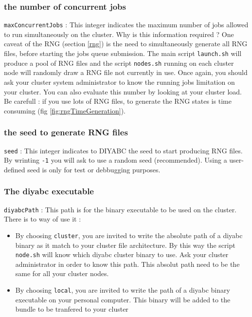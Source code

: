 \subsubsection{the number of concurrent jobs}
\texttt{maxConcurrentJobs} : This integer indicates the maximum number of jobs allowed to run simultaneously on the cluster. Why is this information required ? One caveat of the RNG (section \ref{rng}) is the need to simultaneously generate all RNG files, before starting the jobs queue submission. The main script \texttt{launch.sh} will produce a pool of RNG files and the script \texttt{nodes.sh} running on each cluster node will randomly draw a RNG file not currently in use. Once again, you should ask your cluster system administrator to know the running jobs limitation on your cluster. You can also evaluate this number by looking at your cluster load. Be carefull : if you use lots of RNG files, to generate the RNG states is time consuming (fig \ref{fig:rngTimeGeneration}).

\subsubsection{the seed to generate RNG files}
\texttt{seed} : This integer indicates to DIYABC the seed to start producing RNG files. By wrinting \texttt{-1} you will ask to use a random seed (recommended). Using a user-defined seed is only for test or debbugging purposes. 

\subsubsection{The diyabc executable}
\texttt{diyabcPath} : This path is for the binary executable to be used on the cluster. There is to way of use it :
\begin{itemize}
 \item  By choosing \texttt{cluster}, you are invited to write the absolute path of a diyabc binary as it match to your cluster file architecture. By this way the script \texttt{node.sh} will know which diyabc cluster binary to use. Ask your cluster administrator in order to know this path. This absolut path need to be the same for all your cluster nodes. 
 \item  By choosing \texttt{local}, you are invited to write the path of a diyabc binary executable on your personal computer. This binary will be added to the bundle to be tranfered to your cluster
\end{itemize}

